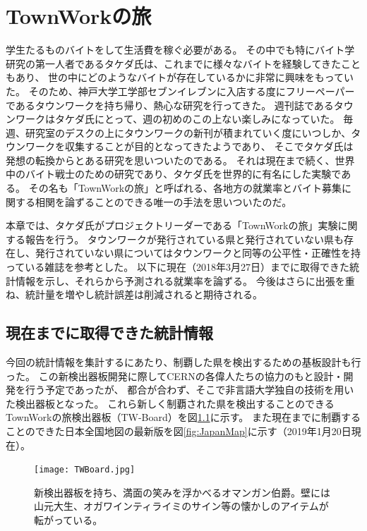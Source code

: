 \chapter{TownWorkの旅}
学生たるものバイトをして生活費を稼ぐ必要がある。
その中でも特にバイト学研究の第一人者であるタケダ氏は、これまでに様々なバイトを経験してきたこともあり、
世の中にどのようなバイトが存在しているかに非常に興味をもっていた。
そのため、神戸大学工学部セブンイレブンに入店する度にフリーペーパーであるタウンワークを持ち帰り、熱心な研究を行ってきた。
週刊誌であるタウンワークはタケダ氏にとって、週の初めのこの上ない楽しみになっていた。
毎週、研究室のデスクの上にタウンワークの新刊が積まれていく度にいつしか、タウンワークを収集することが目的となってきたようであり、
そこでタケダ氏は発想の転換からとある研究を思いついたのである。
それは現在まで続く、世界中のバイト戦士のための研究であり、タケダ氏を世界的に有名にした実験である。
その名も「TownWorkの旅」と呼ばれる、各地方の就業率とバイト募集に関する相関を論ずることのできる唯一の手法を思いついたのだ。
\par
本章では、タケダ氏がプロジェクトリーダーである「TownWorkの旅」実験に関する報告を行う。
タウンワークが発行されている県と発行されていない県も存在し、発行されていない県についてはタウンワークと同等の公平性・正確性を持っている雑誌を参考とした。
以下に現在（2018年3月27日）までに取得できた統計情報を示し、それらから予測される就業率を論ずる。
今後はさらに出張を重ね、統計量を増やし統計誤差は削減されると期待される。

\section{現在までに取得できた統計情報}
今回の統計情報を集計するにあたり、制覇した県を検出するための基板設計も行った。
この新検出器板開発に際してCERNの各偉人たちの協力のもと設計・開発を行う予定であったが、
都合が合わず、そこで非言語大学独自の技術を用いた検出器板となった。
これら新しく制覇された県を検出することのできるTownWorkの旅検出器板（TW-Board）を図\ref{fig:TWBoard}に示す。
また現在までに制覇することのできた日本全国地図の最新版を図\ref{fig:JapanMap}に示す（2019年1月20日現在）。

\begin{figure}
\centering
\texttt{[image: TWBoard.jpg]}
\caption{新検出器板を持ち、満面の笑みを浮かべるオマンガン伯爵。壁には山元大生、オガワインティライミのサイン等の懐かしのアイテムが転がっている。}
\label{fig:TWBoard}
\end{figure}


